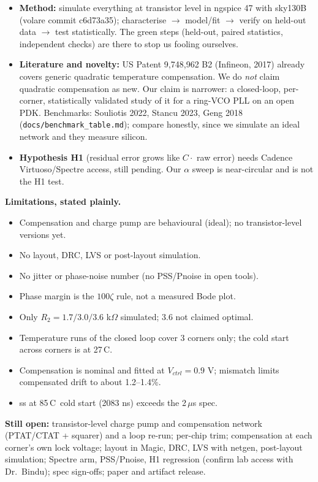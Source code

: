 \documentclass[11pt,a4paper]{article}
\newcommand{\degC}{\textdegree C}
\begin{document}
\begin{itemize}
\item \textbf{Method:} simulate everything at transistor level in ngspice 47 with sky130B (volare commit c6d73a35); characterise $\to$ model/fit $\to$ verify on held-out data $\to$ test statistically. The green steps (held-out, paired statistics, independent checks) are there to stop us fooling ourselves.
\item \textbf{Literature and novelty:} US Patent 9,748,962 B2 (Infineon, 2017) already covers generic quadratic temperature compensation. We do \emph{not} claim quadratic compensation as new. Our claim is narrower: a closed-loop, per-corner, statistically validated study of it for a ring-VCO PLL on an open PDK. Benchmarks: Souliotis 2022, Stancu 2023, Geng 2018 (\texttt{docs/benchmark\_table.md}); compare honestly, since we simulate an ideal network and they measure silicon.
\item \textbf{Hypothesis H1} (residual error grows like $C\cdot$ raw error) needs Cadence Virtuoso/Spectre access, still pending. Our $\alpha$ sweep is near-circular and is not the H1 test.
\end{itemize}
\textbf{Limitations, stated plainly.}
\begin{itemize}
\item Compensation and charge pump are behavioural (ideal); no transistor-level versions yet.
\item No layout, DRC, LVS or post-layout simulation.
\item No jitter or phase-noise number (no PSS/Pnoise in open tools).
\item Phase margin is the $100\zeta$ rule, not a measured Bode plot.
\item Only $R_2=1.7/3.0/3.6$ k$\Omega$ simulated; 3.6 not claimed optimal.
\item Temperature runs of the closed loop cover 3 corners only; the cold start across corners is at 27\,\degC.
\item Compensation is nominal and fitted at $V_{ctrl}=0.9$ V; mismatch limits compensated drift to about 1.2--1.4\%.
\item ss at 85\,\degC\ cold start (2083 ns) exceeds the 2\,$\mu$s spec.
\end{itemize}
\textbf{Still open:} transistor-level charge pump and compensation network (PTAT/CTAT + squarer) and a loop re-run; per-chip trim; compensation at each corner's own lock voltage; layout in Magic, DRC, LVS with netgen, post-layout simulation; Spectre arm, PSS/Pnoise, H1 regression (confirm lab access with Dr.\ Bindu); spec sign-offs; paper and artifact release.
\end{document}
